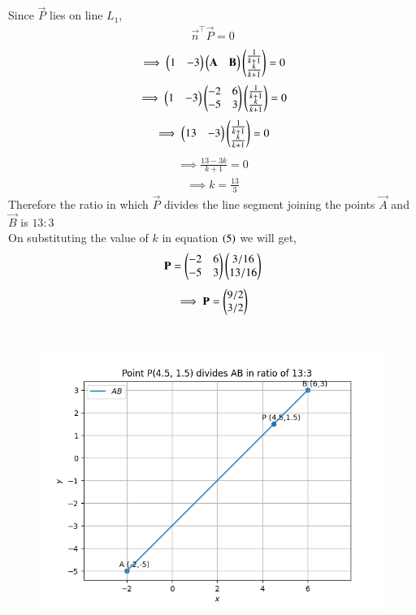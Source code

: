 \documentclass[journal]{IEEEtran}
\begin{document}
Since $\vec{P}$ lies on line $L_1$,
\begin{align}
    \vec{n}^{\top}\vec{P}=0
\end{align}
\begin{align}
    \implies \begin{pmatrix}1 & -3\end{pmatrix}\begin{pmatrix}\mathbf{A} & \mathbf{B}\end{pmatrix}\begin{pmatrix}\frac{1}{k+1}\\\frac{k}{k+1}\end{pmatrix}=0
\end{align}
\begin{align}
    \implies \begin{pmatrix}1 & -3\end{pmatrix}\begin{pmatrix}-2 & 6\\-5 & 3\end{pmatrix}\begin{pmatrix}\frac{1}{k+1}\\\frac{k}{k+1}\end{pmatrix}=0
\end{align}
\begin{align}
    \implies \begin{pmatrix}13 & -3\end{pmatrix}\begin{pmatrix}\frac{1}{k+1}\\\frac{k}{k+1}\end{pmatrix}=0
\end{align}
\begin{align}
    \implies \frac{13-3k}{k+1} = 0
\end{align}
\begin{align}
    \implies k=\frac{13}{3}
\end{align}
Therefore the ratio in which $\vec{P}$ divides the line segment joining the points $\vec{A}$ and $\vec{B}$ is $13:3$\\
On substituting the value of $k$ in equation $\left(5\right)$ we will get,
\begin{align}
    \mathbf{P}=\begin{pmatrix}-2 & 6\\-5 & 3\end{pmatrix}\begin{pmatrix}3/16 \\ 13/16\end{pmatrix}
\end{align}
\begin{align}
    \implies\vec{P}=\begin{myvec}{9/2\\3/2}\end{myvec}
\end{align}\\
\bigskip

\begin{figure}[H]
\begin{center}
\includegraphics[width=0.6\columnwidth]{figs/fig.png}
\end{center}
\label{fig:Fig1}
\end{figure}
\end{document}
